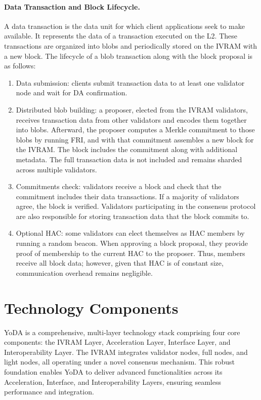 \documentclass[11pt]{article}
\begin{document}
\paragraph{Data Transaction and Block Lifecycle.} A data transaction is the data unit for which client applications seek to make available. It represents the data of a transaction executed on the L2. These transactions are organized into blobs and periodically stored on the IVRAM with a new block. The lifecycle of a blob transaction along with the block proposal is as follows:

\begin{enumerate}
    \item Data submission: clients submit transaction data to at least one validator node and wait for DA confirmation.
    \item Distributed blob building: a proposer, elected from the IVRAM validators, receives transaction data from other validators and encodes them together into blobs. Afterward, the proposer computes a Merkle commitment to those blobs by running FRI, and with that commitment assembles a new block for the IVRAM. The block includes the commitment along with additional metadata. The full transaction data is not included and remains sharded across multiple validators.
    \item Commitments check: validators receive a block and check that the commitment includes their data transactions. If a majority of validators agree, the block is verified. Validators participating in the consensus protocol are also responsible for storing transaction data that the block commits to.
    \item Optional HAC: some validators can elect themselves as HAC members by running a random beacon. When approving a block proposal, they provide proof of membership to the current HAC to the proposer. Thus, members receive all block data; however, given that HAC is of constant size, communication overhead remains negligible.
\end{enumerate}

\section{Technology Components}
YoDA is a comprehensive, multi-layer technology stack comprising four core components: the IVRAM Layer, Acceleration Layer, Interface Layer, and Interoperability Layer. The IVRAM integrates validator nodes, full nodes, and light nodes, all operating under a novel consensus mechanism. This robust foundation enables YoDA to deliver advanced functionalities across its Acceleration, Interface, and Interoperability Layers, ensuring seamless performance and integration.
\end{document}
